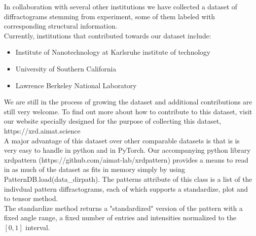 

In collaboration with several other institutions we have collected a dataset of diffractograms stemming from experiment, some of them labeled with corresponding structural information. \\
Currently, institutions that contributed towards our dataset include:
\begin{itemize}
    \item Institute of Nanotechnology at Karlsruhe institute of technology
    \item University of Southern California
    \item Lawrence Berkeley National Laboratory
\end{itemize}

We are still in the process of growing the dataset and additional contributions are still very welcome. 
To find out more about how to contribute to this dataset, visit our website specially designed for the purpose of collecting this dataset, https://xrd.aimat.science \\

A major advantage of this dataset over other comparable datasets is that is is very easy to handle in python and in PyTorch.
Our accompanying python library xrdpattern (https://github.com/aimat-lab/xrdpattern) provides a means to read in as much of the dataset as fits in memory simply by using PatternDB.load(data\_dirpath). The patterns attribute of this class is a list of the indivdual pattern diffractograms, each of which supports a standardize, plot and to tensor method. \\
The standardize method returns a "standardized" version of the pattern with a fixed angle range, a fixed number of entries and intensities normalized to the $[0,1]$ interval.